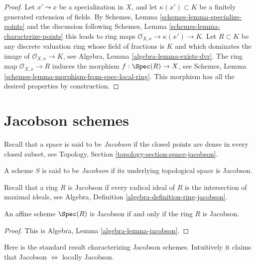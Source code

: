 \begin{proof}
Let $x' \leadsto x$ be a specialization in $X$, and let
$\kappa(x') \subset K$ be a finitely generated extension of fields. By
Schemes, Lemma \ref{schemes-lemma-specialize-points}
and the discussion following
Schemes, Lemma \ref{schemes-lemma-characterize-points}
this leads to ring maps $\mathcal{O}_{X, x} \to \kappa(x') \to K$.
Let $R \subset K$ be any discrete valuation ring whose field of fractions is
$K$ and which dominates the image of $\mathcal{O}_{X, x} \to K$, see
Algebra, Lemma \ref{algebra-lemma-exists-dvr}.
The ring map $\mathcal{O}_{X, x} \to R$ induces the morphism
$f : \Spec(R) \to X$, see
Schemes, Lemma \ref{schemes-lemma-morphism-from-spec-local-ring}.
This morphism has all the desired properties by construction.
\end{proof}




\section{Jacobson schemes}
\label{section-jacobson}

\noindent
Recall that a space is said to be {\it Jacobson} if the closed points are
dense in every closed subset, see
Topology, Section \ref{topology-section-space-jacobson}.

\begin{definition}
\label{definition-jacobson}
A scheme $S$ is said to be {\it Jacobson} if its underlying topological
space is Jacobson.
\end{definition}

\noindent
Recall that a ring $R$ is Jacobson if every radical ideal of $R$
is the intersection of maximal ideals, see
Algebra, Definition \ref{algebra-definition-ring-jacobson}.

\begin{lemma}
\label{lemma-affine-jacobson}
An affine scheme $\Spec(R)$ is Jacobson if and only if
the ring $R$ is Jacobson.
\end{lemma}

\begin{proof}
This is Algebra, Lemma \ref{algebra-lemma-jacobson}.
\end{proof}

\noindent
Here is the standard result characterizing Jacobson schemes.
Intuitively it claims that Jacobson $\Leftrightarrow$ locally Jacobson.

